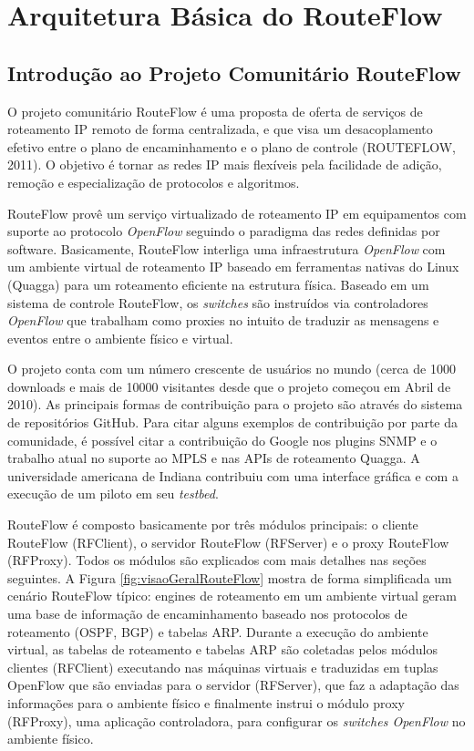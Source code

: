 \chapter{Arquitetura Básica do RouteFlow}

\section{Introdução ao Projeto Comunitário RouteFlow}

O projeto comunitário RouteFlow é uma proposta de oferta de serviços de
roteamento IP remoto de forma centralizada, e que visa um
desacoplamento efetivo entre o plano de encaminhamento e o
plano de controle (ROUTEFLOW, 2011). O objetivo é tornar as
redes IP mais flexíveis pela facilidade de adição,
remoção e especialização de protocolos e algoritmos.


RouteFlow provê um serviço virtualizado de roteamento IP
em equipamentos com suporte ao protocolo \textit{OpenFlow}
seguindo o paradigma das redes definidas por software.
Basicamente, RouteFlow interliga uma infraestrutura 
\textit{OpenFlow} com um ambiente virtual de roteamento 
IP baseado em ferramentas nativas do Linux (Quagga) para
um roteamento eficiente na estrutura física. Baseado em um
sistema de controle RouteFlow, os \textit{switches} 
são instruídos via controladores \textit{OpenFlow} que 
trabalham como proxies no intuito de traduzir as mensagens
e eventos entre o ambiente físico e virtual. 

O projeto conta com um número crescente de usuários no 
mundo (cerca de 1000 downloads e mais de 10000 visitantes
desde que o projeto começou em Abril de 2010). As principais
formas de contribuição para o projeto são através do sistema
de repositórios GitHub. Para citar alguns exemplos de contribuição
por parte da comunidade, é possível citar a contribuição
do Google nos plugins SNMP e o trabalho atual no suporte
ao MPLS e nas APIs de roteamento Quagga. A universidade
americana de Indiana contribuiu com uma interface gráfica
e com a execução de um piloto em seu \textit{testbed}.


RouteFlow é composto basicamente por três módulos principais:
o cliente RouteFlow (RFClient), o servidor RouteFlow (RFServer) e
o proxy RouteFlow (RFProxy). Todos os módulos são
explicados com mais detalhes nas seções seguintes. A Figura \ref{fig:visaoGeralRouteFlow} mostra
de forma simplificada um cenário RouteFlow típico: engines de 
roteamento em um ambiente virtual geram uma base de 
informação de encaminhamento baseado nos protocolos 
de roteamento (OSPF, BGP) e tabelas ARP. Durante a 
execução do ambiente virtual, as tabelas de roteamento e 
tabelas ARP são coletadas pelos módulos clientes (RFClient) executando
nas máquinas virtuais e traduzidas em tuplas OpenFlow que
são enviadas para o servidor (RFServer), que faz a adaptação das 
informações para o ambiente físico e finalmente instrui o 
módulo proxy (RFProxy), uma aplicação controladora, para configurar
os \textit{switches OpenFlow} no ambiente físico.


